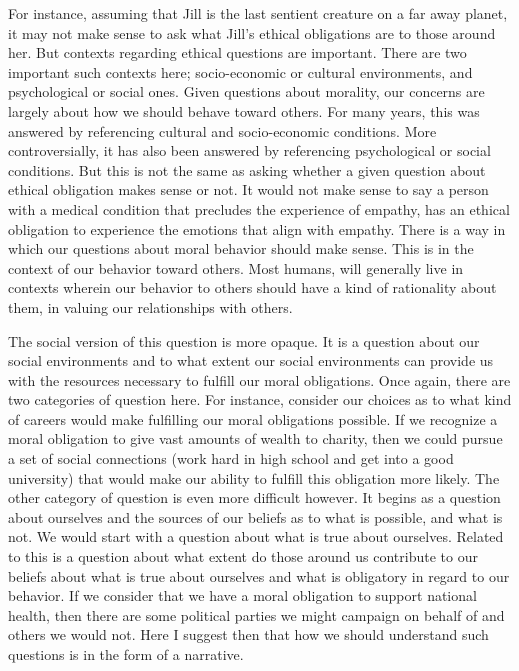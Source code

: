 \documentclass[
  letterpaper,
  DIV=11,
  numbers=noendperiod]{scrreprt}
\begin{document}
\begin{tcolorbox}[enhanced jigsaw, arc=.35mm, breakable, rightrule=.15mm, colback=white, colframe=quarto-callout-important-color-frame, bottomrule=.15mm, leftrule=.75mm, opacityback=0, toprule=.15mm, left=2mm]
\begin{tcolorbox}[enhanced jigsaw, arc=.35mm, breakable, rightrule=.15mm, colback=white, colframe=quarto-callout-tip-color-frame, bottomrule=.15mm, leftrule=.75mm, opacityback=0, toprule=.15mm, left=2mm]
For instance, assuming that Jill is the last sentient creature on a far
away planet, it may not make sense to ask what Jill's ethical
obligations are to those around her. But contexts regarding ethical
questions are important. There are two important such contexts here;
socio-economic or cultural environments, and psychological or social
ones. Given questions about morality, our concerns are largely about how
we should behave toward others. For many years, this was answered by
referencing cultural and socio-economic conditions. More
controversially, it has also been answered by referencing psychological
or social conditions. But this is not the same as asking whether a given
question about ethical obligation makes sense or not. It would not make
sense to say a person with a medical condition that precludes the
experience of empathy, has an ethical obligation to experience the
emotions that align with empathy. There is a way in which our questions
about moral behavior should make sense. This is in the context of our
behavior toward others. Most humans, will generally live in contexts
wherein our behavior to others should have a kind of rationality about
them, in valuing our relationships with others.

The social version of this question is more opaque. It is a question
about our social environments and to what extent our social environments
can provide us with the resources necessary to fulfill our moral
obligations. Once again, there are two categories of question here. For
instance, consider our choices as to what kind of careers would make
fulfilling our moral obligations possible. If we recognize a moral
obligation to give vast amounts of wealth to charity, then we could
pursue a set of social connections (work hard in high school and get
into a good university) that would make our ability to fulfill this
obligation more likely. The other category of question is even more
difficult however. It begins as a question about ourselves and the
sources of our beliefs as to what is possible, and what is not. We would
start with a question about what is true about ourselves. Related to
this is a question about what extent do those around us contribute to
our beliefs about what is true about ourselves and what is obligatory in
regard to our behavior. If we consider that we have a moral obligation
to support national health, then there are some political parties we
might campaign on behalf of and others we would not. Here I suggest then
that how we should understand such questions is in the form of a
narrative.


\end{tcolorbox}
\end{tcolorbox}
\end{document}
